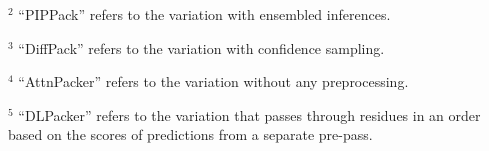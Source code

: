 \begin{table*}[t]
\begin{tablenotes}
        \item[$^{2}$] ``PIPPack'' refers to the variation with ensembled inferences.
        \item[$^{3}$] ``DiffPack'' refers to the variation with confidence sampling.
        \item[$^{4}$] ``AttnPacker'' refers to the variation without any preprocessing.
        \item[$^{5}$] ``DLPacker'' refers to the variation that passes through residues in an order based on the scores of predictions from a separate pre-pass.\vspace*{6pt}
    \end{tablenotes}
\end{table*}
